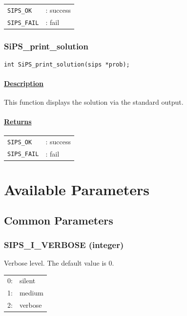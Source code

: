 \documentclass[a4paper]{book}
\begin{document}
\begin{tabular}{ll}
  \verb+SIPS_OK+  &: success\\
  \verb+SIPS_FAIL+&: fail\\
\end{tabular}

\hypertarget{SiPS_print_solution}{%
\subsection{SiPS\_print\_solution}
}

\begin{verbatim}
int SiPS_print_solution(sips *prob);
\end{verbatim}

\subsubsection{\underline{Description}}

This function displays the solution via the standard output.

\subsubsection{\underline{Returns}}

\begin{tabular}{ll}
  \verb+SIPS_OK+  &: success\\
  \verb+SIPS_FAIL+&: fail\\
\end{tabular}

\chapter{Available Parameters}
\label{chap:param}

\section{Common Parameters}

\hypertarget{VERBOSE}{%
\subsection{SIPS\_I\_VERBOSE (integer)}
}

Verbose level.
The default value is 0.

\medskip

\begin{tabular}{r@{~}l}
  0: & silent\\
  1: & medium\\
  2: & verbose\\
\end{tabular}
\end{document}
